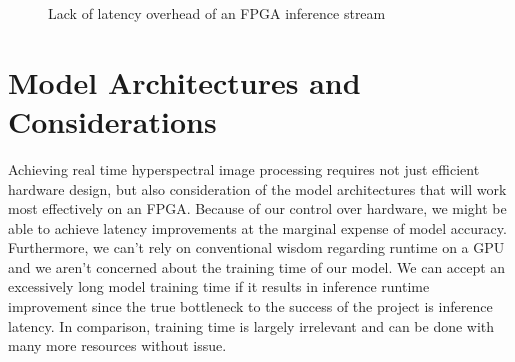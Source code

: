 \documentclass[psamsfonts]{amsart}
\newcommand{\mycomment}[1]{}
\theoremstyle{definition}
\theoremstyle{remark}
\numberwithin{equation}{section}
\begin{document}
\begin{figure}[ht]
  \centering
  \caption{Lack of latency overhead of an FPGA inference stream}
  \label{fig:fpgadiagram}
\end{figure}

\section{Model Architectures and Considerations}
Achieving real time hyperspectral image processing requires not just efficient hardware design, but also consideration of the model architectures that will work most effectively on an FPGA. Because of our control over hardware\mycomment{Note: not sure what I wanted to say here and usage of pipelining and fixed data types},
we might be able to achieve latency improvements at the marginal expense of model accuracy. Furthermore, we can't rely on conventional wisdom regarding runtime on a GPU and we aren't concerned about the training time of our model. We can accept an excessively long model training time if it results in inference runtime improvement since the true bottleneck to the success of the project is inference latency. In comparison, training time is largely irrelevant and can be done with many more resources without issue.
\end{document}

